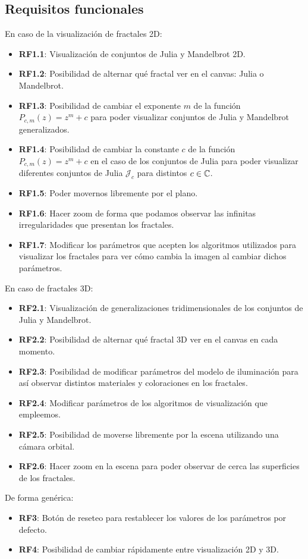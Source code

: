 \subsection*{Requisitos funcionales}
En caso de la visualización de fractales 2D:
\begin{itemize}
    \item \textbf{RF1.1}: Visualización de conjuntos de Julia y Mandelbrot 2D.
    \item \textbf{RF1.2}: Posibilidad de alternar qué fractal ver en el canvas: Julia o Mandelbrot.
    \item \textbf{RF1.3}: Posibilidad de cambiar el exponente $m$ de la función $P_{c,m}(z)=z^m+c$ para poder visualizar conjuntos de Julia y Mandelbrot generalizados.
    \item \textbf{RF1.4}: Posibilidad de cambiar la constante $c$ de la función $P_{c,m}(z)=z^m+c$ en el caso de los conjuntos de Julia para poder visualizar diferentes conjuntos de Julia $\mathcal{J}_c$ para distintos $c\in\mathbb{C}$.
    \item \textbf{RF1.5}: Poder movernos libremente por el plano.
    \item \textbf{RF1.6}: Hacer zoom de forma que podamos observar las infinitas irregularidades que presentan los fractales.
    \item \textbf{RF1.7}: Modificar los parámetros que acepten los algoritmos utilizados para visualizar los fractales para ver cómo cambia la imagen al cambiar dichos parámetros.
\end{itemize}
En caso de fractales 3D:
\begin{itemize}
    \item \textbf{RF2.1}: Visualización de generalizaciones tridimensionales de los conjuntos de Julia y Mandelbrot.
    \item \textbf{RF2.2}: Posibilidad de alternar qué fractal 3D ver en el canvas en cada momento.
    \item \textbf{RF2.3}: Posibilidad de modificar parámetros del modelo de iluminación para así observar distintos materiales y coloraciones en los fractales.
    \item \textbf{RF2.4}: Modificar parámetros de los algoritmos de visualización que empleemos.
    \item \textbf{RF2.5}: Posibilidad de moverse libremente por la escena utilizando una cámara orbital.
    \item \textbf{RF2.6}: Hacer zoom en la escena para poder observar de cerca las superficies de los fractales.
\end{itemize}
De forma genérica:
\begin{itemize}
    \item \textbf{RF3}: Botón de reseteo para restablecer los valores de los parámetros por defecto.
    \item \textbf{RF4}: Posibilidad de cambiar rápidamente entre visualización 2D y 3D.
\end{itemize}

